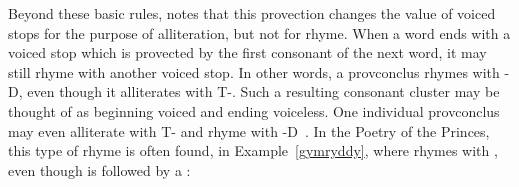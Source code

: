 Beyond these basic rules, \textcite{morris-jones_cerdd_1925} notes that this provection changes the value of voiced stops for the purpose of alliteration, but not for rhyme.
When a word ends with a voiced stop which is provected by the first consonant of the next word, it may still rhyme with another voiced stop.  In other words, a \gls{provconclus} rhymes with -\gls{D}, even though it alliterates with \gls{T}-. Such a resulting consonant cluster may be thought of as beginning voiced and ending voiceless. One individual \gls{provconclus} may even alliterate with \gls{T}- and rhyme with -\gls{D}~\autocite[§~391]{morris-jones_cerdd_1925}. 
In the Poetry of the Princes, this type of rhyme is often found, \eg in Example~\ref{gymryddy}, where  rhymes with , even though  is followed by a :     


